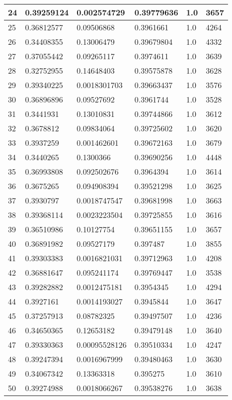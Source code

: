\begin{longtable}{|l|l|l|l|l|l|}
24 & 0.39259124 & 0.002574729 & 0.39779636 & 1.0 & 3657 \\ \hline 
25 & 0.36812577 & 0.09506868 & 0.3961661 & 1.0 & 4264 \\ \hline 
26 & 0.34408355 & 0.13006479 & 0.39679804 & 1.0 & 4332 \\ \hline 
27 & 0.37055442 & 0.09265117 & 0.3974611 & 1.0 & 3639 \\ \hline 
28 & 0.32752955 & 0.14648403 & 0.39575878 & 1.0 & 3628 \\ \hline 
29 & 0.39340225 & 0.0018301703 & 0.39663437 & 1.0 & 3576 \\ \hline 
30 & 0.36896896 & 0.09527692 & 0.3961744 & 1.0 & 3528 \\ \hline 
31 & 0.3441931 & 0.13010831 & 0.39744866 & 1.0 & 3612 \\ \hline 
32 & 0.3678812 & 0.09834064 & 0.39725602 & 1.0 & 3620 \\ \hline 
33 & 0.3937259 & 0.001462601 & 0.39672163 & 1.0 & 3679 \\ \hline 
34 & 0.3440265 & 0.1300366 & 0.39690256 & 1.0 & 4448 \\ \hline 
35 & 0.36993808 & 0.092502676 & 0.3964394 & 1.0 & 3614 \\ \hline 
36 & 0.3675265 & 0.094908394 & 0.39521298 & 1.0 & 3625 \\ \hline 
37 & 0.3930797 & 0.0018747547 & 0.39681998 & 1.0 & 3663 \\ \hline 
38 & 0.39368114 & 0.0023223504 & 0.39725855 & 1.0 & 3616 \\ \hline 
39 & 0.36510986 & 0.10127754 & 0.39651155 & 1.0 & 3657 \\ \hline 
40 & 0.36891982 & 0.09527179 & 0.397487 & 1.0 & 3855 \\ \hline 
41 & 0.39303383 & 0.0016821031 & 0.39712963 & 1.0 & 4208 \\ \hline 
42 & 0.36881647 & 0.095241174 & 0.39769447 & 1.0 & 3538 \\ \hline 
43 & 0.39282882 & 0.0012475181 & 0.3954345 & 1.0 & 4294 \\ \hline 
44 & 0.3927161 & 0.0014193027 & 0.3945844 & 1.0 & 3647 \\ \hline 
45 & 0.37257913 & 0.08782325 & 0.39497507 & 1.0 & 4236 \\ \hline 
46 & 0.34650365 & 0.12653182 & 0.39479148 & 1.0 & 3640 \\ \hline 
47 & 0.39330363 & 0.00095528126 & 0.39510334 & 1.0 & 4247 \\ \hline 
48 & 0.39247394 & 0.0016967999 & 0.39480463 & 1.0 & 3630 \\ \hline 
49 & 0.34067342 & 0.13363318 & 0.395275 & 1.0 & 3610 \\ \hline 
50 & 0.39274988 & 0.0018066267 & 0.39538276 & 1.0 & 3638 \\ \hline 
\end{longtable}